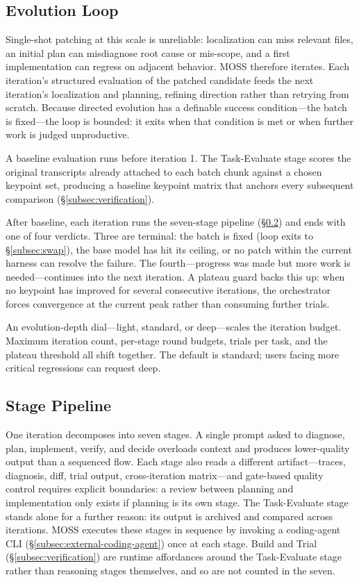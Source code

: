 \subsection{Evolution Loop}
\label{subsec:loop}

Single-shot patching at this scale is unreliable: localization can miss relevant files, an initial plan can misdiagnose root cause or mis-scope, and a first implementation can regress on adjacent behavior. MOSS therefore iterates. Each iteration's structured evaluation of the patched candidate feeds the next iteration's localization and planning, refining direction rather than retrying from scratch. Because directed evolution has a definable success condition---the batch is fixed---the loop is bounded: it exits when that condition is met or when further work is judged unproductive.

A baseline evaluation runs before iteration 1. The Task-Evaluate stage scores the original transcripts already attached to each batch chunk against a chosen keypoint set, producing a baseline keypoint matrix that anchors every subsequent comparison (\S\ref{subsec:verification}).

After baseline, each iteration runs the seven-stage pipeline (\S\ref{subsec:stage-pipeline}) and ends with one of four verdicts. Three are terminal: the batch is fixed (loop exits to \S\ref{subsec:swap}), the base model has hit its ceiling, or no patch within the current harness can resolve the failure. The fourth---progress was made but more work is needed---continues into the next iteration. A plateau guard backs this up: when no keypoint has improved for several consecutive iterations, the orchestrator forces convergence at the current peak rather than consuming further trials.

An evolution-depth dial---light, standard, or deep---scales the iteration budget. Maximum iteration count, per-stage round budgets, trials per task, and the plateau threshold all shift together. The default is standard; users facing more critical regressions can request deep.

\subsection{Stage Pipeline}
\label{subsec:stage-pipeline}

One iteration decomposes into seven stages. A single prompt asked to diagnose, plan, implement, verify, and decide overloads context and produces lower-quality output than a sequenced flow. Each stage also reads a different artifact---traces, diagnosis, diff, trial output, cross-iteration matrix---and gate-based quality control requires explicit boundaries: a review between planning and implementation only exists if planning is its own stage. The Task-Evaluate stage stands alone for a further reason: its output is archived and compared across iterations. MOSS executes these stages in sequence by invoking a coding-agent CLI (\S\ref{subsec:external-coding-agent}) once at each stage. Build and Trial (\S\ref{subsec:verification}) are runtime affordances around the Task-Evaluate stage rather than reasoning stages themselves, and so are not counted in the seven.

